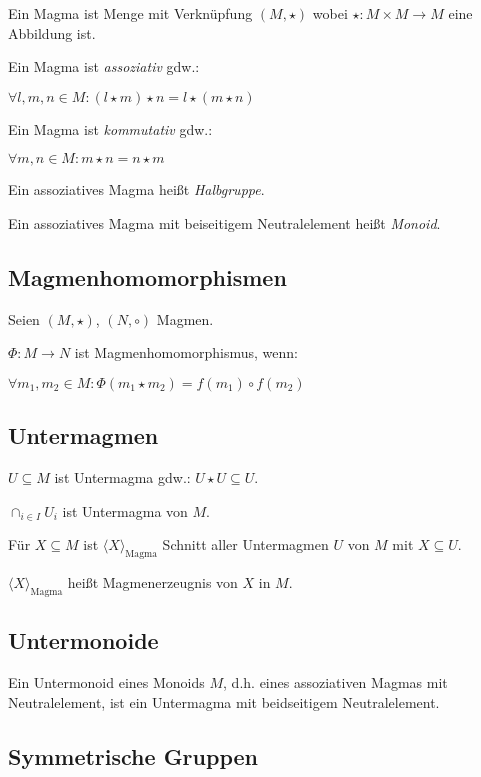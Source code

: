 Ein Magma ist Menge mit Verknüpfung $(M, \star)$ wobei $\star : M \times M \to M$ eine Abbildung ist.

\vspace*{2mm}

Ein Magma ist \emph{assoziativ} gdw.:

$\forall l, m, n \in M : ( l \star m ) \star n = l \star ( m \star n )$

Ein Magma ist \emph{kommutativ} gdw.:

$\forall m, n \in M : m \star n = n \star m$

Ein assoziatives Magma heißt \emph{Halbgruppe}.

Ein assoziatives Magma mit beiseitigem Neutralelement heißt \emph{Monoid}.

\subsection*{Magmenhomomorphismen}

Seien $(M,\star)$, $(N,\circ)$ Magmen.

$\Phi : M \rightarrow N$ ist Magmenhomomorphismus, wenn:

$\forall m_1, m_2 \in M : \Phi(m_1 \star m_2) = f(m_1) \circ f(m_2)$

\subsection*{Untermagmen}

$U \subseteq M$ ist Untermagma gdw.: $U \star U \subseteq U$.

\vspace*{2mm}

$\cap_{i \in I} U_i$ ist Untermagma von $M$.

Für $X \subseteq M$ ist $\langle X \rangle_{\text{Magma}}$ Schnitt aller Untermagmen $U$ von $M$ mit $X \subseteq U$.

$\langle X \rangle_{\text{Magma}}$ heißt Magmenerzeugnis von $X$ in $M$.

\subsection*{Untermonoide}

Ein Untermonoid eines Monoids $M$, d.h. eines assoziativen Magmas mit Neutralelement, ist ein Untermagma mit beidseitigem Neutralelement.

\subsection*{Symmetrische Gruppen}

